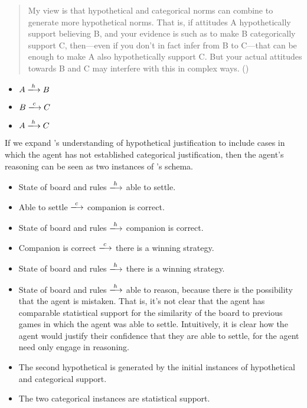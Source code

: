 \documentclass[10pt]{article}
\begin{document}
\begin{quote}
  My view is that hypothetical and categorical norms can combine to generate more hypothetical norms.
  That is, if attitudes A hypothetically support believing B, and your evidence is such as to make B categorically support C, then---even if you don't in fact infer from B to C---that can be enough to make A also hypothetically support C.
  But your actual attitudes towards B and C may interfere with this in complex ways.\nolinebreak
  \mbox{}\hfill\mbox{(\citeyear[128]{Pryor:2018aa})}
\end{quote}

\begin{itemize}
\item \(A \xlongrightarrow{h} B\)
\item \(B \xlongrightarrow{c} C\)
\item \(A \xlongrightarrow{h} C\)
\end{itemize}

If we expand \citeauthor{Pryor:2018aa}'s understanding of hypothetical justification to include cases in which the agent has not established categorical justification, then the agent's reasoning can be seen as two instances of \citeauthor{Pryor:2018aa}'s schema.

\begin{itemize}
\item State of board and rules \(\xlongrightarrow{h}\) able to settle.
\item Able to settle \(\xlongrightarrow{c}\) companion is correct.
\item State of board and rules \(\xlongrightarrow{h}\) companion is correct.
\item Companion is correct \(\xlongrightarrow{c}\) there is a winning strategy.
\item State of board and rules \(\xlongrightarrow{h}\) there is a winning strategy.
\end{itemize}

\begin{itemize}
\item State of board and rules \(\xlongrightarrow{h}\) able to reason, because there is the possibility that the agent is mistaken.
  That is, it's not clear that the agent has comparable statistical support for the similarity of the board to previous games in which the agent was able to settle.
  Intuitively, it is clear how the agent would justify their confidence that they are able to settle, for the agent need only engage in reasoning.
\item The second hypothetical is generated by the initial instances of hypothetical and categorical support.
\item The two categorical instances are statistical support.
\end{itemize}
\end{document}
